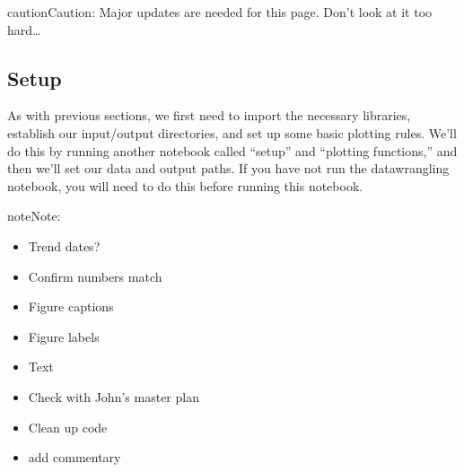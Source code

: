 \documentclass[letterpaper,10pt,english]{jupyterBook}
\begin{document}
\begin{sphinxadmonition}{caution}{Caution:}
\sphinxAtStartPar
Major updates are needed for this page. Don’t look at it too hard…
\end{sphinxadmonition}


\subsection{Setup}
\label{\detokenize{notebooks/regional_and_local/SL_anomaly_annual:setup}}
\sphinxAtStartPar
As with previous sections, we first need to import the necessary libraries, establish our input/output directories, and set up some basic plotting rules. We’ll do this by running another notebook called “setup” and “plotting functions,” and then we’ll set our data and output paths. If you have not run the datawrangling notebook, you will need to do this before running this notebook.

\begin{sphinxShadowBox}
\sphinxstylesidebartitle{}

\begin{sphinxadmonition}{note}{Note:}
\sphinxAtStartPar
{}
\begin{itemize}
\item {} 
\sphinxAtStartPar
Trend dates?

\item {} 
\sphinxAtStartPar
Confirm numbers match

\item {} 
\sphinxAtStartPar
Figure captions

\item {} 
\sphinxAtStartPar
Figure labels

\item {} 
\sphinxAtStartPar
Text

\item {} 
\sphinxAtStartPar
Check with John’s master plan

\item {} 
\sphinxAtStartPar
Clean up code

\item {} 
\sphinxAtStartPar
add commentary

\end{itemize}
\end{sphinxadmonition}
\end{sphinxShadowBox}

\begin{sphinxVerbatim}[commandchars=\\\{\}]

\end{sphinxVerbatim}
\end{document}
